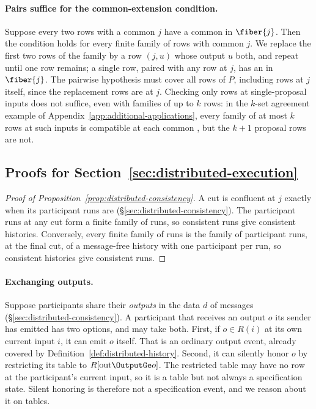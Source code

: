 \paragraph{Pairs suffice for the common-extension condition.}
\label{app:pairs-suffice}
Suppose every two rows with a common \indesc $j$ have a common \outnoun in
$\fiber{j}$.  Then the condition holds for every finite family of rows with
common \indesc $j$.  We replace the first two rows of the family by a row
$(j,u)$ whose output $u$ \outrel both, and repeat until one row remains; a
single row, paired with any row at $j$, has an \outnoun in $\fiber{j}$.  The
pairwise hypothesis must cover all rows of $P$, including rows at $j$ itself,
since the replacement rows are at $j$.  Checking only rows at single-proposal
inputs does not suffice, even with families of up to $k$ rows: in the $k$-set agreement example of
Appendix~\ref{app:additional-applications}, every family of at most $k$ rows
at such inputs is compatible at each common \indesc, but the $k+1$ proposal
rows are not.

\subsection{Proofs for Section~\ref{sec:distributed-execution}}
\label{app:proofs-sec4}

\begin{proof}[Proof of Proposition~\ref{prop:distributed-consistency}]
A cut is confluent at $j$ exactly when its participant runs are
(\S\ref{sec:distributed-consistency}).  The participant runs at any cut form a
finite family of runs, so consistent runs give consistent histories.
Conversely, every finite family of runs is the family of participant runs, at
the final cut, of a message-free history with one participant per run, so
consistent histories give consistent runs.
\end{proof}

\paragraph{Exchanging outputs.}
\label{app:exchanging-outputs}
Suppose participants share their \emph{outputs} in the data $d$ of messages
(\S\ref{sec:distributed-consistency}).  A participant that receives an
output $o$ its sender has emitted has two options, and may take both.  First,
if $o\in R(i)$ at its own current input $i$, it can emit $o$ itself.  That is
an ordinary output event, already covered by
Definition~\ref{def:distributed-history}.  Second, it can silently honor $o$
by restricting its table to $R[\mathrm{out}\OutputGe o]$.  The restricted
table may have no row at the participant's current input, so it is a table
but not always a specification state.  Silent honoring is therefore not a
specification event, and we reason about it on tables.

